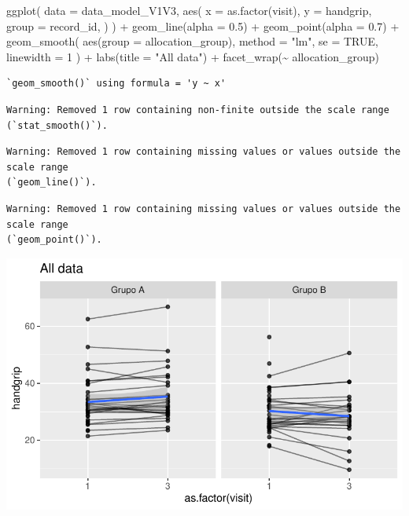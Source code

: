 \documentclass[
  letterpaper,
  DIV=11,
  numbers=noendperiod]{scrartcl}
\newenvironment{Shaded}{\begin{snugshade}}{\end{snugshade}}
\newcommand{\AttributeTok}[1]{\textcolor[rgb]{0.40,0.45,0.13}{#1}}
\newcommand{\ConstantTok}[1]{\textcolor[rgb]{0.56,0.35,0.01}{#1}}
\newcommand{\DecValTok}[1]{\textcolor[rgb]{0.68,0.00,0.00}{#1}}
\newcommand{\FloatTok}[1]{\textcolor[rgb]{0.68,0.00,0.00}{#1}}
\newcommand{\FunctionTok}[1]{\textcolor[rgb]{0.28,0.35,0.67}{#1}}
\newcommand{\NormalTok}[1]{\textcolor[rgb]{0.00,0.23,0.31}{#1}}
\newcommand{\SpecialCharTok}[1]{\textcolor[rgb]{0.37,0.37,0.37}{#1}}
\newcommand{\StringTok}[1]{\textcolor[rgb]{0.13,0.47,0.30}{#1}}
\begin{document}
\begin{Shaded}
\begin{Highlighting}[]
\FunctionTok{ggplot}\NormalTok{(}
    \AttributeTok{data =}\NormalTok{ data\_model\_V1V3, }
    \FunctionTok{aes}\NormalTok{(}
        \AttributeTok{x =} \FunctionTok{as.factor}\NormalTok{(visit),}
        \AttributeTok{y =}\NormalTok{ handgrip,}
        \AttributeTok{group =}\NormalTok{ record\_id,}
\NormalTok{    )}
\NormalTok{) }\SpecialCharTok{+}
    \FunctionTok{geom\_line}\NormalTok{(}\AttributeTok{alpha =} \FloatTok{0.5}\NormalTok{) }\SpecialCharTok{+}
    \FunctionTok{geom\_point}\NormalTok{(}\AttributeTok{alpha =} \FloatTok{0.7}\NormalTok{) }\SpecialCharTok{+}
    \FunctionTok{geom\_smooth}\NormalTok{(}
        \FunctionTok{aes}\NormalTok{(}\AttributeTok{group =}\NormalTok{ allocation\_group),}
        \AttributeTok{method =} \StringTok{"lm"}\NormalTok{,}
        \AttributeTok{se =} \ConstantTok{TRUE}\NormalTok{,}
        \AttributeTok{linewidth =} \DecValTok{1}
\NormalTok{    ) }\SpecialCharTok{+}
    \FunctionTok{labs}\NormalTok{(}\AttributeTok{title =} \StringTok{"All data"}\NormalTok{) }\SpecialCharTok{+}
    \FunctionTok{facet\_wrap}\NormalTok{(}\SpecialCharTok{\textasciitilde{}}\NormalTok{ allocation\_group)}
\end{Highlighting}
\end{Shaded}

\begin{verbatim}
`geom_smooth()` using formula = 'y ~ x'
\end{verbatim}

\begin{verbatim}
Warning: Removed 1 row containing non-finite outside the scale range
(`stat_smooth()`).
\end{verbatim}

\begin{verbatim}
Warning: Removed 1 row containing missing values or values outside the scale range
(`geom_line()`).
\end{verbatim}

\begin{verbatim}
Warning: Removed 1 row containing missing values or values outside the scale range
(`geom_point()`).
\end{verbatim}

\includegraphics{Outcomes_V1V2V3_files/figure-pdf/handgrip_6-1.pdf}
\end{document}
